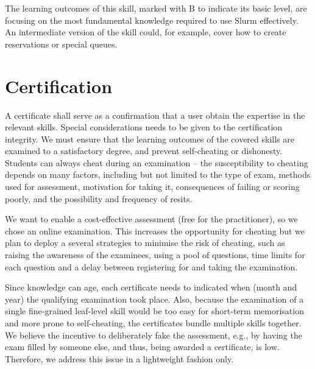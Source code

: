\documentclass[jocse]{jocseart}
\begin{document}
The learning outcomes of this skill, marked with B to indicate its basic level, are focusing on the most fundamental knowledge required to use Slurm effectively.
An intermediate version of the skill could, for example, cover how to create reservations or special queues.



\section{Certification}
\label{sec:certification}

A certificate shall serve as a confirmation that a user obtain the expertise in the relevant skills.
Special considerations needs to be given to the certification integrity.
We must ensure that the learning outcomes of the covered skills are examined to a satisfactory degree, and prevent self-cheating or dishonesty.
Students can always cheat during an examination -- the susceptibility to cheating depends on many factors, including but not limited to the type of exam, methods used for assessment, motivation for taking it,  consequences of failing or scoring poorly, and the possibility and frequency of resits.

We want to enable a cost-effective assessment (free for the practitioner), so we chose an online examination.
This increases the opportunity for cheating \cite{rowe2004cheating} but we plan to deploy a several strategies to minimise the risk of cheating, such as raising the awareness of the examinees, using a pool of questions, time limits for each question and a delay between registering for and taking the examination.

Since knowledge can age, each certificate needs to indicated when (month and year) the qualifying examination took place.
Also, because the examination of a single fine-grained leaf-level skill would be too easy for short-term memorisation and more prone to self-cheating, the certificates bundle multiple skills together.
We believe the incentive to deliberately fake the assessment, e.g., by having the exam filled by someone else, and thus, being awarded a certificate, is low.
Therefore, we address this issue in a lightweight fashion only.
\end{document}
